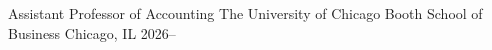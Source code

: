 

\begin{cventries}
    \cventry
    {Assistant Professor of Accounting} %
    {The University of Chicago Booth School of Business} %
    {Chicago, IL} %
    {2026--} %
    {}
\end{cventries}
